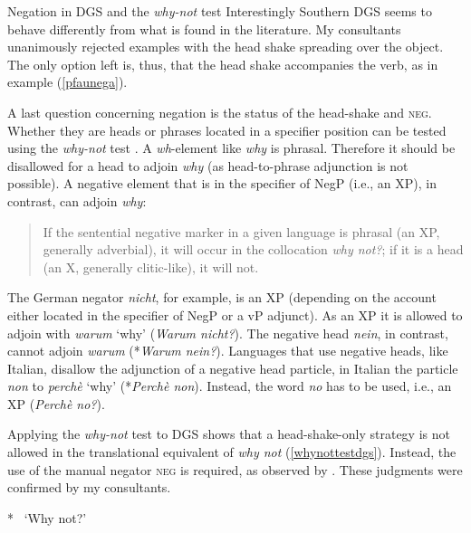 \begin{digression}{Negation in DGS and the \textit{why-not} test}{}
Interestingly Southern DGS seems to behave differently from what is found in the literature. My consultants unanimously rejected examples with the head shake spreading over the object. The only option left is, thus, that the head shake accompanies the verb, as in example (\ref{pfaunega}).

A last question concerning negation is the status of the head-shake and \textsc{neg}. Whether they are heads or phrases located in a specifier position can be tested using the \textit{why-not} test \citep{merchant2006no, zeijlstra2015morpho}. A \textit{wh}-element like \textit{why} is phrasal. Therefore it should be disallowed for a head to adjoin \textit{why} (as head-to-phrase adjunction is not possible).  A negative element that is in the specifier of NegP (i.e., an XP), in contrast, can adjoin \textit{why}:

\begin{quote}
If the sentential negative marker in a given language is phrasal (an XP, generally adverbial), it will occur in the collocation \textit{why not?}; if it is a head (an X\textdegree , generally clitic-like), it will not. \citep[20]{merchant2006no}
\end{quote}

\noindent The German negator \textit{nicht}, for example, is an XP (depending on the account either located in the specifier of NegP or a vP adjunct). As an XP it is allowed to adjoin with \textit{warum} `why' (\textit{Warum nicht?}). The negative head \textit{nein}, in contrast, cannot adjoin \textit{warum} (*\textit{Warum nein?}). Languages that use negative heads, like Italian, disallow the adjunction of a negative head particle, in Italian the particle \textit{non} to \textit{perchè} `why' (*\textit{Perchè non}). Instead, the word \textit{no} has to be used, i.e., an XP (\textit{Perchè no?}).

Applying the \textit{why-not} test to DGS shows that a head-shake-only strategy is not allowed in the translational equivalent of \textit{why not} (\ref{whynottestdgs}). Instead, the use of the manual negator \textsc{neg} is required, as observed by \citet[56]{pfau2016featural}. These judgments were confirmed by my consultants.

\begin{exe}
\ex\label{whynottestdgs}\begin{xlist}
\ex\label{ex:modaldoublingneg} *
\glt \textcolor{white}{*}`Why not?'


\end{xlist}
\end{exe}
\end{digression}
